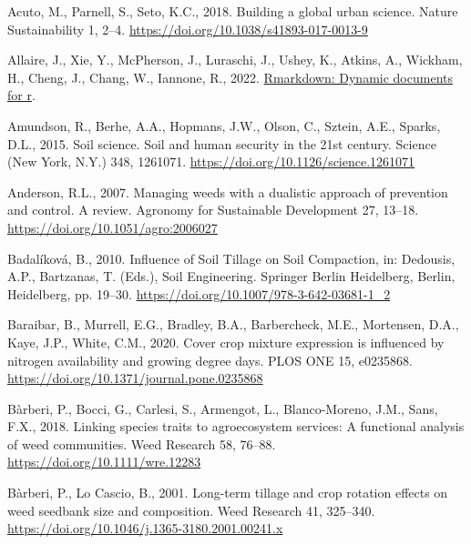 \documentclass[
  12pt,
]{article}
\newlength{\cslhangindent}
\newlength{\cslentryspacingunit} %
\newenvironment{CSLReferences}[2] %
 {%
  \setlength{\parindent}{0pt}
  \ifodd #1
  \let\oldpar\par
  \def\par{\hangindent=\cslhangindent\oldpar}
  \fi
  \setlength{\parskip}{#2\cslentryspacingunit}
 }%
 {}
\begin{document}
\hypertarget{refs}{}
\begin{CSLReferences}{1}{0}
\leavevmode{}%
Acuto, M., Parnell, S., Seto, K.C., 2018. Building a global urban science. Nature Sustainability 1, 2--4. \url{https://doi.org/10.1038/s41893-017-0013-9}

\leavevmode{}%
Allaire, J., Xie, Y., McPherson, J., Luraschi, J., Ushey, K., Atkins, A., Wickham, H., Cheng, J., Chang, W., Iannone, R., 2022. \href{https://github.com/rstudio/rmarkdown}{Rmarkdown: Dynamic documents for r}.

\leavevmode{}%
Amundson, R., Berhe, A.A., Hopmans, J.W., Olson, C., Sztein, A.E., Sparks, D.L., 2015. Soil science. {Soil} and human security in the 21st century. Science (New York, N.Y.) 348, 1261071. \url{https://doi.org/10.1126/science.1261071}

\leavevmode{}%
Anderson, R.L., 2007. Managing weeds with a dualistic approach of prevention and control. {A} review. Agronomy for Sustainable Development 27, 13--18. \url{https://doi.org/10.1051/agro:2006027}

\leavevmode{}%
Badalíková, B., 2010. Influence of {Soil Tillage} on {Soil Compaction}, in: Dedousis, A.P., Bartzanas, T. (Eds.), Soil {Engineering}. {Springer Berlin Heidelberg}, {Berlin, Heidelberg}, pp. 19--30. \url{https://doi.org/10.1007/978-3-642-03681-1_2}

\leavevmode{}%
Baraibar, B., Murrell, E.G., Bradley, B.A., Barbercheck, M.E., Mortensen, D.A., Kaye, J.P., White, C.M., 2020. Cover crop mixture expression is influenced by nitrogen availability and growing degree days. PLOS ONE 15, e0235868. \url{https://doi.org/10.1371/journal.pone.0235868}

\leavevmode{}%
Bàrberi, P., Bocci, G., Carlesi, S., Armengot, L., Blanco-Moreno, J.M., Sans, F.X., 2018. Linking species traits to agroecosystem services: A functional analysis of weed communities. Weed Research 58, 76--88. \url{https://doi.org/10.1111/wre.12283}

\leavevmode{}%
Bàrberi, P., Lo Cascio, B., 2001. Long-term tillage and crop rotation effects on weed seedbank size and composition. Weed Research 41, 325--340. \url{https://doi.org/10.1046/j.1365-3180.2001.00241.x}


\end{CSLReferences}
\end{document}
